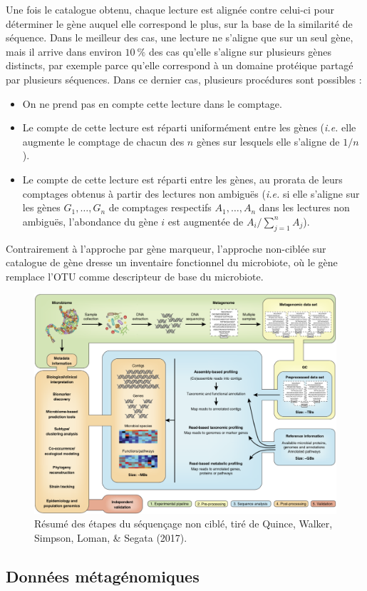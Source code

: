 \documentclass[12pt,a4paper]{reedthesis}
\theoremstyle{definition}
\theoremstyle{definition}
\theoremstyle{definition}
\theoremstyle{remark}
\begin{document}
Une fois le catalogue obtenu, chaque lecture est alignée contre celui-ci pour déterminer le gène auquel elle correspond le plus, sur la base de la similarité de séquence. Dans le meilleur des cas, une lecture ne s'aligne que sur un seul gène, mais il arrive dans environ \(10~\%\) des cas qu'elle s'aligne sur plusieurs gènes distincts, par exemple parce qu'elle correspond à un domaine protéique partagé par plusieurs séquences. Dans ce dernier cas, plusieurs procédures sont possibles :
\begin{itemize}
\item
  On ne prend pas en compte cette lecture dans le comptage.
\item
  Le compte de cette lecture est réparti uniformément entre les gènes (\emph{i.e.} elle augmente le comptage de chacun des \(n\) gènes sur lesquels elle s'aligne de \(1/n\)).
\item
  Le compte de cette lecture est réparti entre les gènes, au prorata de leurs comptages obtenus à partir des lectures non ambiguës (\emph{i.e.} si elle s'aligne sur les gènes \(G_1, \dots, G_n\) de comptages respectifs \(A_1, \dots, A_n\) dans les lectures non ambiguës, l'abondance du gène \(i\) est augmentée de \(A_i / \sum_{j=1}^n A_j\)).
\end{itemize}
Contrairement à l'approche par gène marqueur, l'approche non-ciblée sur catalogue de gène dresse un inventaire fonctionnel du microbiote, où le gène remplace l'OTU comme descripteur de base du microbiote.


\begin{figure}

{\centering \includegraphics[width=0.9\linewidth]{img/shotgun} 

}

\caption{Résumé des étapes du séquençage non ciblé, tiré de Quince, Walker, Simpson, Loman, \& Segata (2017).}\label{fig:shotgun}
\end{figure}
\hypertarget{donneesmetagenomiques}{%
\subsection{Données métagénomiques}\label{donneesmetagenomiques}}
\end{document}
